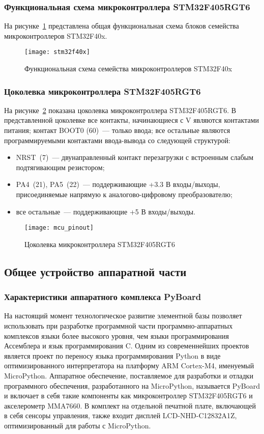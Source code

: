 \documentclass[document.tex]{subfiles}
\begin{document}
\clearpage
\subsubsection{Функциональная схема микроконтроллера STM32F405RGT6}
На рисунке~\ref{fig:mcu} представлена общая функциональная схема блоков семейства микрокон\-троллеров STM32F40x.
\begin{figure}[h]
\centering
\texttt{[image: stm32f40x]}
\caption{Функциональная схема семейства микроконтроллеров STM32F40x}
\label{fig:mcu}
\end{figure}

\clearpage
\subsubsection{Цоколевка микроконтроллера STM32F405RGT6}
На рисунке~\ref{fig:mcu_pinout} показана цоколевка микроконтроллера STM32F405RGT6. В представленной цоколевке все контакты, начинающиеся с V являются контактами питания;
контакт BOOT0 (60)~--- только ввода; все остальные являются программируемыми контактами ввода-вывода со следующей структурой:
\begin{itemize}
	\item NRST~(7)~--- двунаправленный контакт перезагрузки с встроенным слабым подтягива\-ющим резистором;
	\item PA4~(21), PA5~(22)~--- поддерживающие +3.3 В входы/выходы, присоединяемые напрямую к аналогово-цифровому преобразователю;
	\item все остальные~--- поддерживающие +5 В входы/выходы.\cite{mcu}
\end{itemize}

\begin{figure}[h]
\centering
\texttt{[image: mcu\_pinout]}
\caption{Цоколевка микроконтроллера STM32F405RGT6}
\label{fig:mcu_pinout}
\end{figure}

\clearpage
\subsection{Общее устройство аппаратной части}
\subsubsection{Характеристики аппаратного комплекса PyBoard}
На настоящий момент технологическое развитие элементной базы позволяет использовать при разработке программной части программно-аппаратных комплексов языки более высоко\-го уровня,
чем языки программирования Ассемблера и язык программирования C. Одним из современнейших проектов является проект по переносу языка программирования Python в виде оптимизированного
интерпретатора на платформу ARM Cortex-M4, именуемый MicroPython. Аппаратное обеспечение, поставляемое для разработки и отладки программного обеспечения, разработанного на
MicroPython, называется PyBoard и включает в себя такие компоненты как микроконтроллер STM32F405RGT6 и акселерометр MMA7660. В комплект на отдельной печатной плате, включающей в
себя сенсоры управления, также входит дисплей LCD-NHD-C12832A1Z, оптимизированный для работы с MicroPython.\cite{pyboard_hardware}
\end{document}
